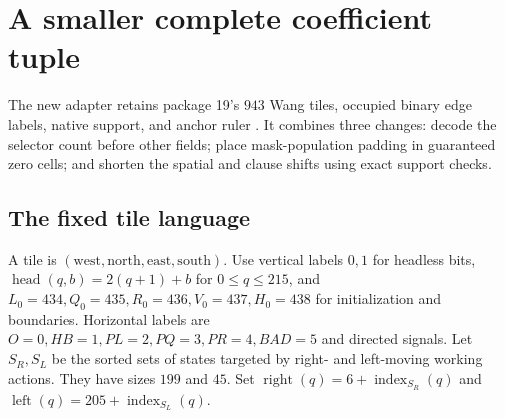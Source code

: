\documentclass[11pt,a4paper]{article}
\theoremstyle{remark}\newtheorem{remark}[theorem]{Remark}
\begin{document}
\section{A smaller complete coefficient tuple}
\label{sec:coefficients}

The new adapter retains package 19's $943$ Wang tiles, occupied binary
edge labels, native support, and anchor ruler \cite{wang943,compact943}.
It combines three changes: decode the selector count before other fields;
place mask-population padding in guaranteed zero cells; and shorten the
spatial and clause shifts using exact support checks.

\subsection{The fixed tile language}

A tile is $(\mathrm{west},\mathrm{north},\mathrm{east},\mathrm{south})$.
Use vertical labels $0,1$ for headless bits,
$\operatorname{head}(q,b)=2(q+1)+b$ for $0\le q\le215$, and
$L_0=434,Q_0=435,R_0=436,V_0=437,H_0=438$ for initialization and boundaries.
Horizontal labels are $O=0,HB=1,PL=2,PQ=3,PR=4,BAD=5$ and directed
signals. Let $S_R,S_L$ be the sorted sets of states targeted by right-
and left-moving working actions. They have sizes $199$ and $45$.
Set $\operatorname{right}(q)=6+\operatorname{index}_{S_R}(q)$ and
$\operatorname{left}(q)=205+\operatorname{index}_{S_L}(q)$.
\end{document}
